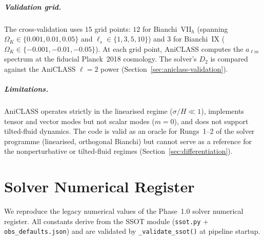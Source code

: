 \paragraph{Validation grid.}

The cross-validation uses $15$ grid points: $12$ for
Bianchi~VII$_h$ (spanning
$\Omega_K \in \{0.001, 0.01, 0.05\}$ and
$\ell_s \in \{1, 3, 5, 10\}$) and $3$ for Bianchi~IX
($\Omega_K \in \{-0.001, -0.01, -0.05\}$).  At each grid
point, AniCLASS computes the $a_{\ell m}$ spectrum at the
fiducial Planck~2018 cosmology.  The solver's $D_2$ is
compared against the AniCLASS $\ell = 2$ power
(Section~\ref{sec:aniclass-validation}).


\paragraph{Limitations.}

AniCLASS operates strictly in the linearised regime
($\sigma/H \ll 1$), implements tensor and vector modes but
not scalar modes ($m = 0$), and does not support tilted-fluid
dynamics.  The code is valid as an oracle for Rungs~1--2 of
the solver programme (linearised, orthogonal Bianchi) but
cannot serve as a reference for the nonperturbative or
tilted-fluid regimes (Section~\ref{sec:differentiation}).


\chapter{Solver Numerical Register}
\label{app:ssot}

We reproduce the legacy numerical values of the Phase~1.0 solver
numerical register.  All constants derive from the SSOT
module (\texttt{ssot.py} + \texttt{obs\_defaults.json})
and are validated by \texttt{\_validate\_ssot()} at pipeline
startup.

